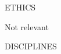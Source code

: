 \documentclass[11pt,dvipsnames,usenames,a4paper]{article}
\begin{document}







\vspace{5mm}

\begin{shaded}\centering ETHICS \end{shaded}

Not relevant

\vspace{5mm}

\begin{shaded}\centering DISCIPLINES \end{shaded}
\end{document}
